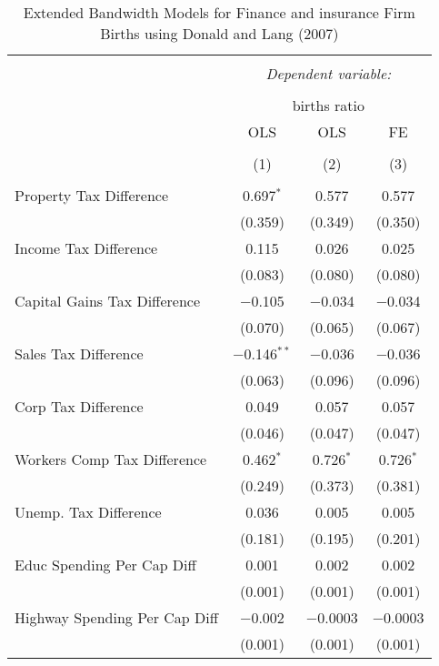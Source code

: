 
\begin{table}[!htbp] \centering 
  \caption{Extended Bandwidth Models for  Finance and insurance Firm Births using Donald and Lang (2007)} 
  \label{} 
\begin{tabular}{@{\extracolsep{5pt}}lccc} 
\\[-1.8ex]\hline 
\hline \\[-1.8ex] 
 & \multicolumn{3}{c}{\textit{Dependent variable:}} \\ 
\cline{2-4} 
\\[-1.8ex] & \multicolumn{3}{c}{births ratio} \\ 
 & OLS & OLS & FE \\ 
\\[-1.8ex] & (1) & (2) & (3)\\ 
\hline \\[-1.8ex] 
 Property Tax Difference & 0.697$^{*}$ & 0.577 & 0.577 \\ 
  & (0.359) & (0.349) & (0.350) \\ 
  Income Tax Difference & 0.115 & 0.026 & 0.025 \\ 
  & (0.083) & (0.080) & (0.080) \\ 
  Capital Gains Tax Difference & $-$0.105 & $-$0.034 & $-$0.034 \\ 
  & (0.070) & (0.065) & (0.067) \\ 
  Sales Tax Difference & $-$0.146$^{**}$ & $-$0.036 & $-$0.036 \\ 
  & (0.063) & (0.096) & (0.096) \\ 
  Corp Tax Difference & 0.049 & 0.057 & 0.057 \\ 
  & (0.046) & (0.047) & (0.047) \\ 
  Workers Comp Tax Difference & 0.462$^{*}$ & 0.726$^{*}$ & 0.726$^{*}$ \\ 
  & (0.249) & (0.373) & (0.381) \\ 
  Unemp. Tax Difference & 0.036 & 0.005 & 0.005 \\ 
  & (0.181) & (0.195) & (0.201) \\ 
  Educ Spending Per Cap Diff & 0.001 & 0.002 & 0.002 \\ 
  & (0.001) & (0.001) & (0.001) \\ 
  Highway Spending Per Cap Diff & $-$0.002 & $-$0.0003 & $-$0.0003 \\ 
  & (0.001) & (0.001) & (0.001) \\ 

\end{tabular}
\end{table}
